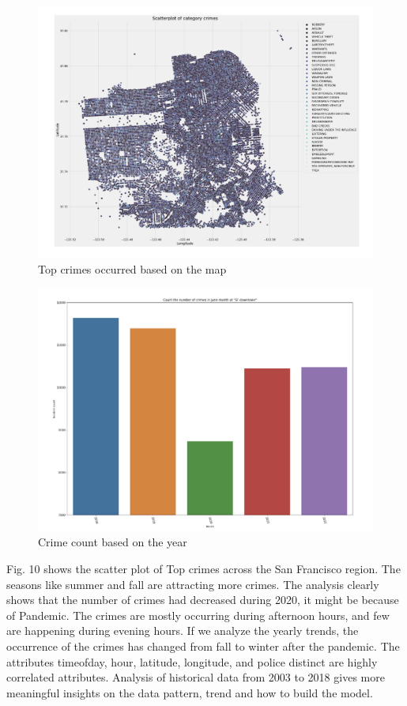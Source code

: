 \documentclass[11 pt,conference,final,]{IEEEtran}
\begin{document}
\begin{figure}

{\centering \includegraphics[width=0.8\linewidth]{img/fig10} 

}

\caption{Top crimes occurred based on the map}\label{fig:unnamed-chunk-10}
\end{figure}

\begin{figure}

{\centering \includegraphics[width=0.8\linewidth]{img/fig11} 

}

\caption{Crime count based on the year}\label{fig:unnamed-chunk-11}
\end{figure}

Fig. 10 shows the scatter plot of Top crimes across the San Francisco
region. The seasons like summer and fall are attracting more crimes. The
analysis clearly shows that the number of crimes had decreased during
2020, it might be because of Pandemic. The crimes are mostly occurring
during afternoon hours, and few are happening during evening hours. If
we analyze the yearly trends, the occurrence of the crimes has changed
from fall to winter after the pandemic. The attributes timeofday, hour,
latitude, longitude, and police distinct are highly correlated
attributes. Analysis of historical data from 2003 to 2018 gives more
meaningful insights on the data pattern, trend and how to build the
model.
\end{document}
